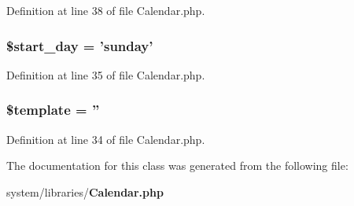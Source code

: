 Definition at line 38 of file Calendar.\-php.

\subsubsection[{\$start\-\_\-day}]{\setlength{\rightskip}{0pt plus 5cm}\$start\-\_\-day = 'sunday'}\label{class_c_i___calendar_ac4e461505bb7cd9a2fdb2bf47560a389}


Definition at line 35 of file Calendar.\-php.

\subsubsection[{\$template}]{\setlength{\rightskip}{0pt plus 5cm}\$template = ''}\label{class_c_i___calendar_aa3e9534005fd516d941f6a5569896e01}


Definition at line 34 of file Calendar.\-php.



The documentation for this class was generated from the following file\-:\begin{DoxyCompactItemize}
\item 
system/libraries/{\bf Calendar.\-php}\end{DoxyCompactItemize}
